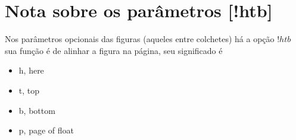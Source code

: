\documentclass[12pt, a4paper]{article}
\begin{document}
\newpage

\section{Nota sobre os parâmetros [!htb]}
Nos parâmetros opcionais das figuras (aqueles entre colchetes) há a opção $!htb$ sua função é de alinhar a figura na página, seu significado é
\begin{itemize}
\item h, here
\item t, top
\item b, bottom
\item p, page of float
\end{itemize}


\end{document}
